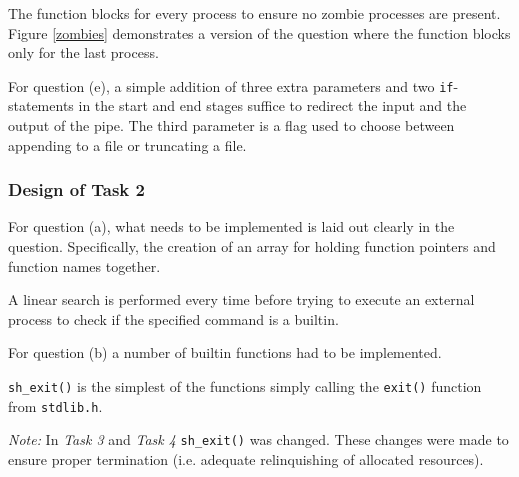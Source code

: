\documentclass[12pt]{article}
\begin{document}
The function blocks for every process to ensure no zombie
processes are present. Figure \ref{zombies} demonstrates a
version of the question where the function blocks only for the
last process.

\newpage





For question (e), a simple addition of three extra parameters
and two \texttt{if}-statements in the start and end stages
suffice to redirect the input and the output of the pipe. The
third parameter is a flag used to choose between appending to a
file or truncating a file.

\newpage

\subsubsection{Design of Task 2}



For question (a), what needs to be implemented is laid out
clearly in the question. Specifically, the creation of an array
for holding function pointers and function names together. 



A linear search is performed every time before trying to execute
an external process to check if the specified command is a
builtin.

For question (b) a number of builtin functions had to be
implemented.

\texttt{sh\_exit()} is the simplest of the functions simply
calling the \texttt{exit()} function from \texttt{stdlib.h}.

\textit{Note:} In \textit{Task 3} and \textit{Task 4}
\texttt{sh\_exit()} was changed. These changes were made to
ensure proper termination (i.e. adequate relinquishing of
allocated resources).

\newpage


\end{document}
